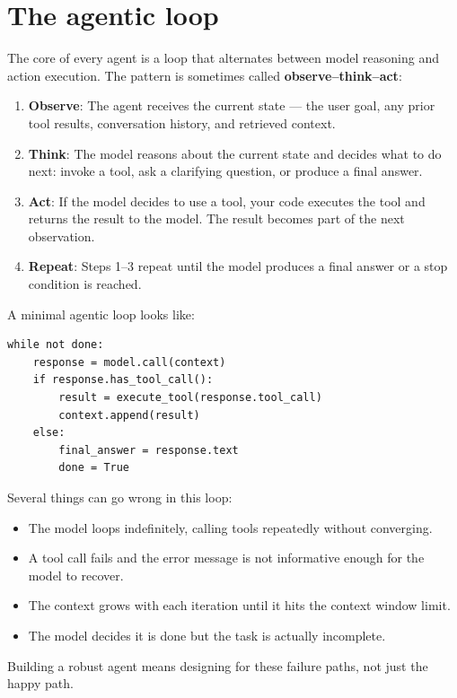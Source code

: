 \section{The agentic loop}

The core of every agent is a loop that alternates between model reasoning and action execution. The pattern is sometimes called \textbf{observe--think--act}:

\begin{enumerate}[noitemsep,topsep=0pt]
  \item \textbf{Observe}: The agent receives the current state --- the user goal, any prior tool results, conversation history, and retrieved context.
  \item \textbf{Think}: The model reasons about the current state and decides what to do next: invoke a tool, ask a clarifying question, or produce a final answer.
  \item \textbf{Act}: If the model decides to use a tool, your code executes the tool and returns the result to the model. The result becomes part of the next observation.
  \item \textbf{Repeat}: Steps 1--3 repeat until the model produces a final answer or a stop condition is reached.
\end{enumerate}

A minimal agentic loop looks like:

\begin{verbatim}
while not done:
    response = model.call(context)
    if response.has_tool_call():
        result = execute_tool(response.tool_call)
        context.append(result)
    else:
        final_answer = response.text
        done = True
\end{verbatim}

Several things can go wrong in this loop:

\begin{itemize}[noitemsep,topsep=0pt]
  \item The model loops indefinitely, calling tools repeatedly without converging.
  \item A tool call fails and the error message is not informative enough for the model to recover.
  \item The context grows with each iteration until it hits the context window limit.
  \item The model decides it is done but the task is actually incomplete.
\end{itemize}

Building a robust agent means designing for these failure paths, not just the happy path.

